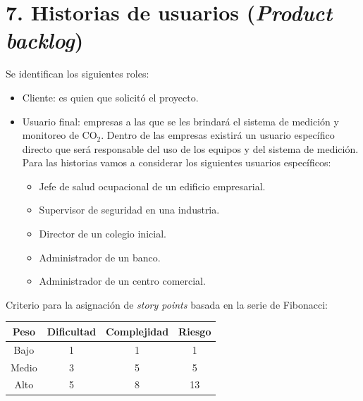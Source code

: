 \documentclass[
11pt, %
]{charter}
\begin{document}
\section{7. Historias de usuarios (\textit{Product backlog})}
\label{sec:backlog}
Se identifican los siguientes roles:
\begin{itemize}
 \item Cliente: es quien que solicitó el proyecto.
 \item Usuario final: empresas a las que se les brindará el sistema de medición y monitoreo de CO$_{2}$. Dentro de las empresas existirá un usuario específico directo que será responsable del uso de los equipos y del sistema de medición. Para las historias vamos a considerar los siguientes usuarios específicos: 
 	\begin{itemize}
 	\item Jefe de salud ocupacional de un edificio empresarial.
 	\item Supervisor de seguridad en una industria.
 	\item Director de un colegio inicial.
 	\item Administrador de un banco.
 	\item Administrador de un centro comercial.
 	\end{itemize} 
 \end{itemize} 
 
Criterio para la asignación de \textit{story points} basada en la serie de Fibonacci:

\begin{center}
\begin{tabular}{|c|c|c|c|}
\hline 
Peso & Dificultad & Complejidad & Riesgo \\ 
\hline 
Bajo & 1 & 1 & 1 \\ 
\hline 
Medio & 3 & 5 & 5 \\ 
\hline 
Alto & 5 & 8 & 13 \\ 
\hline 
\end{tabular} 
\end{center}
\end{document}
